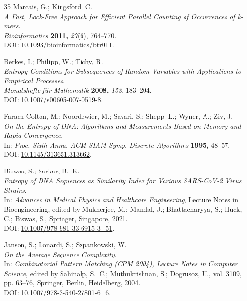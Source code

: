 \documentclass{article}
\theoremstyle{remark}
\begin{document}
\begin{thebibliography}{35}
Marcais, G.; Kingsford, C.\\
\textit{A Fast, Lock-Free Approach for Efficient Parallel Counting of Occurrences of k-mers}.\\
\textit{Bioinformatics} \textbf{2011,} \textit{27}(6), 764--770.\\
DOI: \href{https://doi.org/10.1093/bioinformatics/btr011}{10.1093/bioinformatics/btr011}.

Berkes, I.; Philipp, W.; Tichy, R.\\
\textit{Entropy Conditions for Subsequences of Random Variables with Applications to Empirical Processes}.\\
\textit{Monatshefte f\"ur Mathematik} \textbf{2008,} \textit{153}, 183--204.\\
DOI: \href{https://doi.org/10.1007/s00605-007-0519-8}{10.1007/s00605-007-0519-8}.

Farach-Colton, M.; Noordewier, M.; Savari, S.; Shepp, L.; Wyner, A.; Ziv, J.\\
\textit{On the Entropy of DNA: Algorithms and Measurements Based on Memory and Rapid Convergence}.\\
In: \textit{Proc. Sixth Annu. ACM-SIAM Symp. Discrete Algorithms} \textbf{1995,} 48--57.\\
DOI: \href{https://doi.org/10.1145/313651.313662}{10.1145/313651.313662}.

Biswas, S.; Sarkar, B.~K.\\
\textit{Entropy of DNA Sequences as Similarity Index for Various SARS-CoV-2 Virus Strains}.\\
In: \textit{Advances in Medical Physics and Healthcare Engineering}, Lecture Notes in Bioengineering, edited by Mukherjee, M.; Mandal, J.; Bhattacharyya, S.; Huck, C.; Biswas, S., Springer, Singapore, 2021.\\
DOI: \href{https://doi.org/10.1007/978-981-33-6915-3_51}{10.1007/978-981-33-6915-3\_51}.

Janson, S.; Lonardi, S.; Szpankowski, W.\\
\textit{On the Average Sequence Complexity}.\\
In: \textit{Combinatorial Pattern Matching (CPM 2004), Lecture Notes in Computer Science}, edited by Sahinalp, S.~C.; Muthukrishnan, S.; Dogrusoz, U., vol. 3109, pp. 63--76, Springer, Berlin, Heidelberg, 2004.\\
DOI: \href{https://doi.org/10.1007/978-3-540-27801-6_6}{10.1007/978-3-540-27801-6\_6}.


\end{thebibliography}
\end{document}
